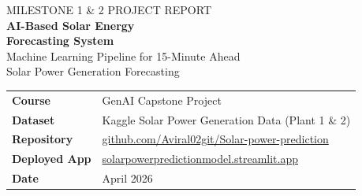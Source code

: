 \documentclass[11pt, a4paper]{article}
\begin{document}
\begin{titlepage}
\thispagestyle{empty}


\vspace*{1.2cm}

\begin{center}
  {\small\sffamily\color{white}MILESTONE 1 \& 2 \textperiodcentered{} PROJECT REPORT}\\[0.6cm]
  {\Huge\bfseries\sffamily\color{white} AI-Based Solar Energy\\[0.2cm] Forecasting System}\\[0.5cm]
  {\large\sffamily\color{white!80!navyblue}
    Machine Learning Pipeline for 15-Minute Ahead\\Solar Power Generation Forecasting}
\end{center}

\vspace{2.6cm}

\begin{center}
\begin{tabular}{@{} L{4cm} L{8cm} @{}}
\toprule
\textbf{Course}       & GenAI Capstone Project \\[3pt]
\textbf{Dataset}      & Kaggle Solar Power Generation Data (Plant 1 \& 2) \\[3pt]
\textbf{Repository}   & \href{https://github.com/Aviral02git/Solar-power-prediction}
                         {github.com/Aviral02git/Solar-power-prediction} \\[3pt]
\textbf{Deployed App} & \href{https://solarpowerpredictionmodel.streamlit.app/}
                         {solarpowerpredictionmodel.streamlit.app} \\[3pt]
\textbf{Date}         & April 2026 \\
\bottomrule
\end{tabular}
\end{center}

\vfill


\end{titlepage}
\end{document}
